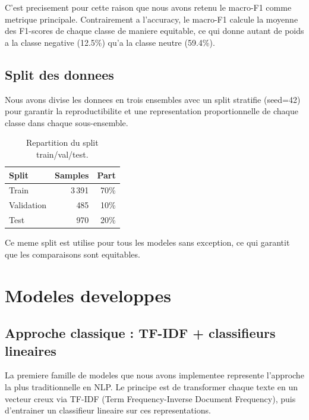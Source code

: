 \documentclass[12pt, a4paper]{article}
\begin{document}
C'est precisement pour cette raison que nous avons retenu le macro-F1 comme metrique
principale. Contrairement a l'accuracy, le macro-F1 calcule la moyenne des F1-scores
de chaque classe de maniere equitable, ce qui donne autant de poids a la classe
negative (12.5\%) qu'a la classe neutre (59.4\%).

\subsection{Split des donnees}

Nous avons divise les donnees en trois ensembles avec un split stratifie (seed=42)
pour garantir la reproductibilite et une representation proportionnelle de chaque
classe dans chaque sous-ensemble.

\begin{table}[h]
  \centering
  \begin{tabular}{lrr}
    \toprule
    Split      & Samples & Part \\
    \midrule
    Train      & 3\,391  & 70\% \\
    Validation &    485  & 10\% \\
    Test       &    970  & 20\% \\
    \bottomrule
  \end{tabular}
  \caption{Repartition du split train/val/test.}
\end{table}

Ce meme split est utilise pour tous les modeles sans exception, ce qui garantit
que les comparaisons sont equitables.

\section{Modeles developpes}

\subsection{Approche classique : TF-IDF + classifieurs lineaires}

La premiere famille de modeles que nous avons implementee represente l'approche
la plus traditionnelle en NLP. Le principe est de transformer chaque texte en un
vecteur creux via TF-IDF (Term Frequency-Inverse Document Frequency), puis
d'entrainer un classifieur lineaire sur ces representations.
\end{document}
